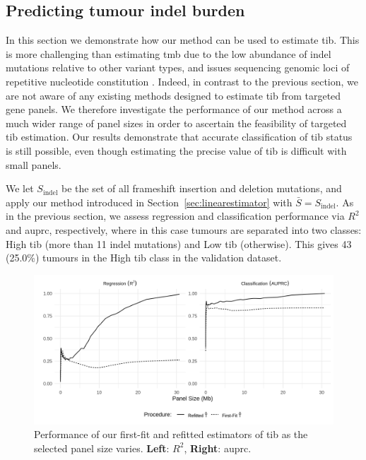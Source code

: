 \documentclass[12pt]{article}
\begin{document}


\subsection{Predicting tumour indel burden \label{sec:indel}}
In this section we demonstrate how our method can be used to estimate \acrshort{tib}. 
This is more challenging than estimating \acrshort{tmb} due to the low abundance of indel mutations relative to other variant types, and issues sequencing genomic loci of repetitive nucleotide constitution \citep{narzisi_challenge_2015}. Indeed, in contrast to the previous section, we are not aware of any existing methods designed to estimate \acrshort{tib} from targeted gene panels. We therefore investigate the performance of our method across a much wider range of panel sizes in order to ascertain the feasibility of targeted \acrshort{tib} estimation. Our results demonstrate that accurate classification of \acrshort{tib} status is still possible, even though estimating the precise value of \acrshort{tib} is difficult with small panels.  

We let $S_{\text{indel}}$ be the set of all frameshift insertion and deletion mutations, and apply our method introduced in Section~\ref{sec:linearestimator} with $\bar{S} = S_{\text{indel}}$. As in the previous section, we assess regression and classification performance via $R^2$ and \acrshort{auprc}, respectively, where in this case tumours are separated into two classes: High \acrshort{tib} (more than 11 indel mutations) and Low \acrshort{tib} (otherwise). This gives 43 (25.0\%) tumours in the High \acrshort{tib} class in the validation dataset. 

\begin{figure}[htbp]
\centering
\includegraphics[width=6in]{fig9.png}
\vspace*{-5mm}
\caption{Performance of our first-fit and refitted estimators of \acrshort{tib} as the selected panel size varies. \textbf{Left}: $R^2$, \textbf{Right}: \acrshort{auprc}. \label{fig:indelstatsplot}}
\vspace*{-2mm}
\end{figure}
\end{document}
